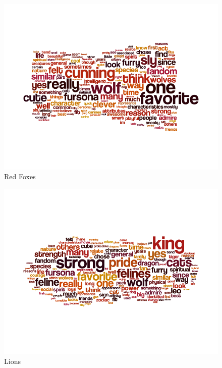 \begin{figure}
  \begin{center}
    \includegraphics[width=\textwidth]{content/assets/species-2--redfox}
  \end{center}
  \caption{Red Foxes}
\end{figure}

\begin{figure}
  \begin{center}
    \includegraphics[width=\textwidth]{content/assets/species-2--lion}
  \end{center}
  \caption{Lions}
\end{figure}

